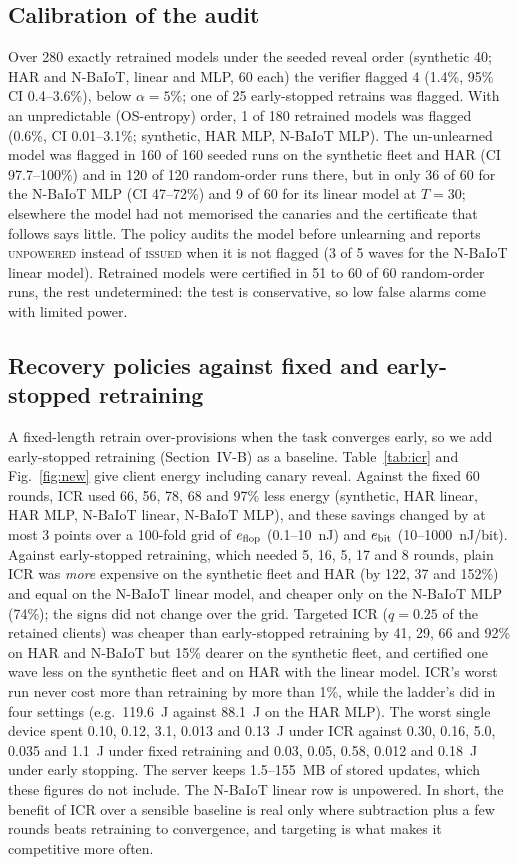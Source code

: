 \documentclass[journal]{IEEEtran}
\begin{document}
\subsection{Calibration of the audit}\label{sec:cal}
Over 280 exactly retrained models under the seeded reveal order (synthetic 40; HAR and N-BaIoT, linear and MLP, 60 each) the verifier flagged 4 (1.4\%, 95\% CI 0.4--3.6\%), below $\alpha=5\%$; one of 25 early-stopped retrains was flagged. With an unpredictable (OS-entropy) order, 1 of 180 retrained models was flagged (0.6\%, CI 0.01--3.1\%; synthetic, HAR MLP, N-BaIoT MLP). The un-unlearned model was flagged in 160 of 160 seeded runs on the synthetic fleet and HAR (CI 97.7--100\%) and in 120 of 120 random-order runs there, but in only 36 of 60 for the N-BaIoT MLP (CI 47--72\%) and 9 of 60 for its linear model at $T=30$; elsewhere the model had not memorised the canaries and the certificate that follows says little. The policy audits the model before unlearning and reports \textsc{unpowered} instead of \textsc{issued} when it is not flagged (3 of 5 waves for the N-BaIoT linear model). Retrained models were certified in 51 to 60 of 60 random-order runs, the rest undetermined: the test is conservative, so low false alarms come with limited power.

\subsection{Recovery policies against fixed and early-stopped retraining}\label{sec:icr}
A fixed-length retrain over-provisions when the task converges early, so we add early-stopped retraining (Section~IV-B) as a baseline. Table~\ref{tab:icr} and Fig.~\ref{fig:new} give client energy including canary reveal. Against the fixed 60 rounds, ICR used 66, 56, 78, 68 and 97\% less energy (synthetic, HAR linear, HAR MLP, N-BaIoT linear, N-BaIoT MLP), and these savings changed by at most 3 points over a 100-fold grid of $e_{\rm flop}$ (0.1--10~nJ) and $e_{\rm bit}$ (10--1000~nJ/bit). Against early-stopped retraining, which needed 5, 16, 5, 17 and 8 rounds, plain ICR was \emph{more} expensive on the synthetic fleet and HAR (by 122, 37 and 152\%) and equal on the N-BaIoT linear model, and cheaper only on the N-BaIoT MLP (74\%); the signs did not change over the grid. Targeted ICR ($q=0.25$ of the retained clients) was cheaper than early-stopped retraining by 41, 29, 66 and 92\% on HAR and N-BaIoT but 15\% dearer on the synthetic fleet, and certified one wave less on the synthetic fleet and on HAR with the linear model. ICR's worst run never cost more than retraining by more than 1\%, while the ladder's did in four settings (e.g.\ 119.6~J against 88.1~J on the HAR MLP). The worst single device spent 0.10, 0.12, 3.1, 0.013 and 0.13~J under ICR against 0.30, 0.16, 5.0, 0.035 and 1.1~J under fixed retraining and 0.03, 0.05, 0.58, 0.012 and 0.18~J under early stopping. The server keeps 1.5--155~MB of stored updates, which these figures do not include. The N-BaIoT linear row is unpowered. In short, the benefit of ICR over a sensible baseline is real only where subtraction plus a few rounds beats retraining to convergence, and targeting is what makes it competitive more often.
\end{document}
